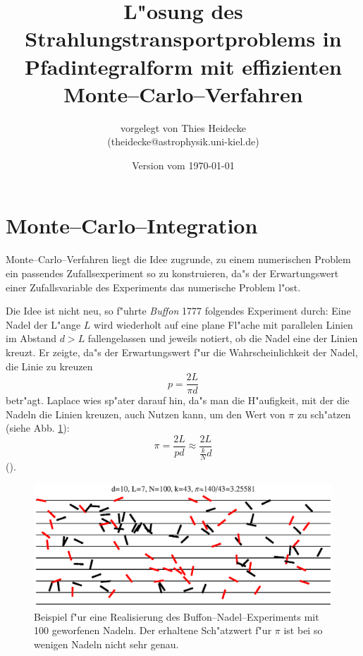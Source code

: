 \documentclass[11pt,a4paper,DIVcalc,BCOR8mm,titlepage,twoside]{scrartcl}
\begin{document}
	\titlehead{Christian--Albrechts--Universit"at zu Kiel\\ Institut f"ur Theoretische Physik und Astrophysik}
	\subject{Diplomarbeit}
	\title{L"osung des Strahlungstransportproblems in Pfadintegralform mit effizienten Monte--Carlo--Verfahren}
	\author{vorgelegt von Thies Heidecke\\(theidecke@astrophysik.uni-kiel.de)}
	\publishers{betreut durch Prof. Sebastian Wolf}
	\date{Version vom \today}
	\maketitle

	\tableofcontents
	\vfill
	\pagebreak
	
	\newcommand{\location}[1]{\mathbf{#1}}
	\newcommand{\scatter}[1]{\overset{#1}{\leftrightsquigarrow}}
	\newcommand{\normalized}[1]{\frac{#1}{||#1||}}
	
	
	
	
	
	\section{Monte--Carlo--Integration}
	Monte--Carlo--Verfahren liegt die Idee zugrunde, zu einem numerischen Problem ein passendes Zufallsexperiment so zu konstruieren, da"s der Erwartungswert einer Zufallsvariable des Experiments das numerische Problem l"ost.
	
	Die Idee ist nicht neu, so f"uhrte {\em Buffon} 1777 folgendes Experiment durch: Eine Nadel der L"ange $L$ wird wiederholt auf eine plane Fl"ache mit parallelen Linien im Abstand $d>L$ fallengelassen und jeweils notiert, ob die Nadel eine der Linien kreuzt. Er zeigte, da"s der Erwartungswert f"ur die Wahrscheinlichkeit der Nadel, die Linie zu kreuzen $$p=\frac{2L}{\pi d}$$ betr"agt. Laplace wies sp"ater darauf hin, da"s  man die H"aufigkeit, mit der die Nadeln die Linien kreuzen, auch Nutzen kann, um den Wert von $\pi$ zu sch"atzen (siehe Abb. \ref{fig:buffon}): $$\pi=\frac{2L}{p d}\approx \frac{2L}{\frac{k}{N}d}$$
	().
	\begin{figure}
		\centering
		\includegraphics[height=0.3\textheight]{buffonsneedles.eps}
		\caption{Beispiel f"ur eine Realisierung des Buffon--Nadel--Experiments mit 100 geworfenen Nadeln. Der erhaltene Sch"atzwert f"ur $\pi$ ist bei so wenigen Nadeln nicht sehr genau.}
		\label{fig:buffon}
	\end{figure}
	
\end{document}
